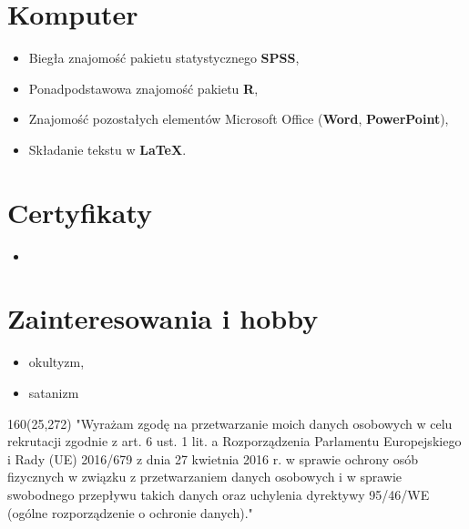 \documentclass[10pt,a4paper,sans]{moderncv}   %
\begin{document}

\section{Komputer}
{\begin{itemize}
	\item Biegła znajomość pakietu statystycznego \textbf{SPSS},
    \item Ponadpodstawowa znajomość pakietu \textbf{R},
	\item Znajomość pozostałych elementów Microsoft Office (\textbf{Word}, \textbf{PowerPoint}),
	\item Składanie tekstu w \textbf{\LaTeX}.
\end{itemize}}

\section{Certyfikaty}
{\begin{itemize}
 \item
\end{itemize}}


\section{Zainteresowania i hobby}
{\begin{itemize}
\item okultyzm,
\item satanizm

\end{itemize}}

\begin{textblock}{160}(25,272)
\noindent "Wyrażam zgodę na przetwarzanie moich danych osobowych w celu rekrutacji zgodnie z art. 6 ust. 1 lit. a Rozporządzenia Parlamentu Europejskiego i Rady (UE) 2016/679 z dnia 27 kwietnia 2016 r. w sprawie ochrony osób fizycznych w związku z przetwarzaniem danych osobowych i w sprawie swobodnego przepływu takich danych oraz uchylenia dyrektywy 95/46/WE (ogólne rozporządzenie o ochronie danych)."

\end{textblock}
\end{document}
